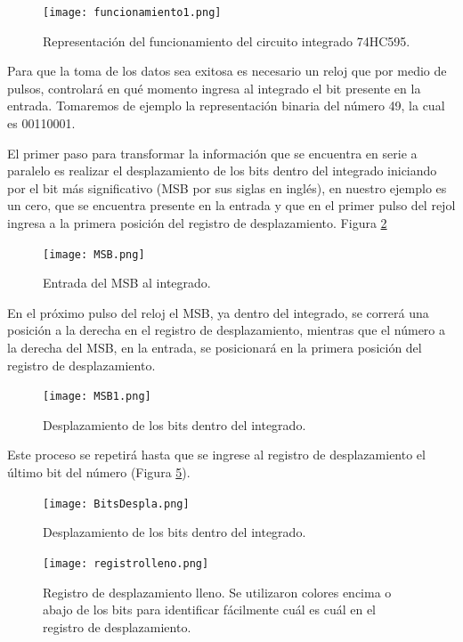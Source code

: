 \documentclass{article}
\begin{document}
\begin{figure}[h]
\texttt{[image: funcionamiento1.png]}
\centering
\caption{Representación del funcionamiento del circuito integrado 74HC595.}
\label{fig:func1}
\end{figure}

Para que la toma de los datos sea exitosa es necesario un reloj que por medio de pulsos, controlará en qué momento ingresa al integrado el bit presente en la entrada. Tomaremos de ejemplo la representación binaria del número 49, la cual es 00110001.

El primer paso para transformar la información que se encuentra en serie a paralelo es realizar el desplazamiento de los bits dentro del integrado iniciando por el bit más significativo (MSB por sus siglas en inglés), en nuestro ejemplo es un cero, que se encuentra presente en la entrada y que en el primer pulso del rejol ingresa a la primera posición del registro de desplazamiento. Figura \ref{fig:MSB}

\begin{figure}[h]
\texttt{[image: MSB.png]}
\centering
\caption{Entrada del MSB al integrado.}
\label{fig:MSB}
\end{figure}

En el próximo pulso del reloj el MSB, ya dentro del integrado, se correrá una posición a la derecha en el registro de desplazamiento, mientras que el número a la derecha del MSB, en la entrada, se posicionará en la primera posición del registro de desplazamiento.

\newpage
\begin{figure}[h]
\texttt{[image: MSB1.png]}
\centering
\caption{Desplazamiento de los bits dentro del integrado.}
\label{fig:MSB1}
\end{figure}

Este proceso se repetirá hasta que se ingrese al registro de desplazamiento el último bit del número (Figura \ref{fig:registrolleno}).

\begin{figure}[h]
\texttt{[image: BitsDespla.png]}
\centering
\caption{Desplazamiento de los bits dentro del integrado.}
\label{fig:bitsdespla}
\end{figure}

\begin{figure}[h]
\texttt{[image: registrolleno.png]}
\centering
\caption{Registro de desplazamiento lleno. Se utilizaron colores encima o abajo de los bits para identificar fácilmente cuál es cuál en el registro de desplazamiento.}
\label{fig:registrolleno}
\end{figure}
\end{document}
